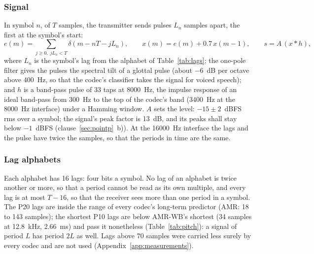 \subsubsection{Signal}
In symbol $n$, of $T$ samples, the transmitter sends pulses $L_n$ samples
apart, the first at the symbol's start:
\[ e(m) = \sum_{j \ge 0,\; jL_n < T} \delta(m - nT - jL_n), \qquad
   x(m) = e(m) + 0.7\,x(m-1), \qquad s = A\,(x * h), \]
where $L_n$ is the symbol's lag from the alphabet of
Table~\ref{tab:lags}; the one-pole filter gives the pulses the spectral
tilt of a glottal pulse (about $-6$~dB per octave above 400~Hz, so that
the codec's classifier takes the signal for voiced speech); and $h$ is a
band-pass pulse of 33 taps at 8000~Hz, the impulse response of an ideal
band-pass from 300~Hz to the top of the codec's band (3400~Hz at the
8000~Hz interface) under a Hamming window.  $A$ sets the level:
$-15 \pm 2$~dBFS rms over a symbol; the signal's peak factor is 13~dB,
and its peaks shall stay below $-1$~dBFS (clause~\ref{sec:pointp}~b)).
At the 16000~Hz interface the lags and the pulse have twice the samples,
so that the periods in time are the same.

\subsubsection{Lag alphabets}
\begin{table}[htbp]
\caption{The lag alphabets (samples at 8000~Hz) and the mapping of the bits}
\label{tab:lags}
\centering\small
{}
\end{table}
Each alphabet has 16 lags: four bits a symbol.  No lag of an alphabet is
twice another or more, so that a period cannot be read as its own
multiple, and every lag is at most $T - 16$, so that the receiver sees
more than one period in a symbol.  The P20 lags are inside the range of
every codec's long-term predictor (AMR: 18 to 143 samples); the shortest
P10 lags are below AMR-WB's shortest (34 samples at 12.8~kHz, 2.66~ms)
and pass it nonetheless (Table~\ref{tab:pitch}): a signal of period $L$
has period $2L$ as well.  Lags above 70 samples were carried less surely
by every codec and are not used (Appendix~\ref{app:measurements}).

